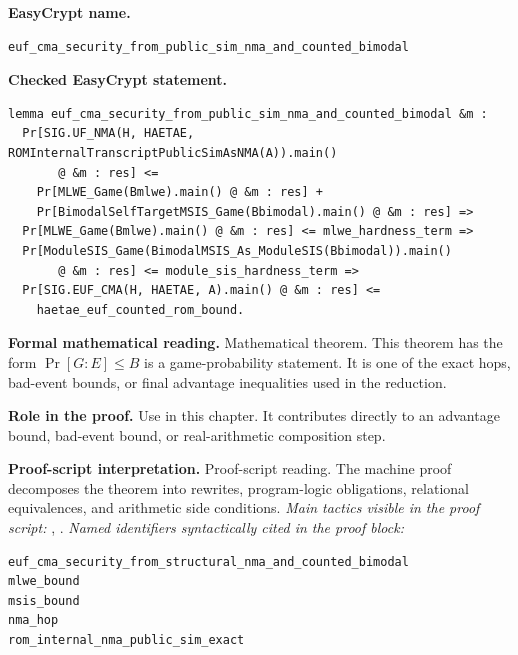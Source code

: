 \begin{formaltheorem}
\noindent\textbf{EasyCrypt name.}
\begin{lstlisting}[language=EasyCrypt,basicstyle=\ttfamily\scriptsize]
euf_cma_security_from_public_sim_nma_and_counted_bimodal
\end{lstlisting}
\noindent\textbf{Checked EasyCrypt statement.}
\begin{lstlisting}[language=EasyCrypt,basicstyle=\ttfamily\scriptsize]
lemma euf_cma_security_from_public_sim_nma_and_counted_bimodal &m :
  Pr[SIG.UF_NMA(H, HAETAE, ROMInternalTranscriptPublicSimAsNMA(A)).main()
       @ &m : res] <=
    Pr[MLWE_Game(Bmlwe).main() @ &m : res] +
    Pr[BimodalSelfTargetMSIS_Game(Bbimodal).main() @ &m : res] =>
  Pr[MLWE_Game(Bmlwe).main() @ &m : res] <= mlwe_hardness_term =>
  Pr[ModuleSIS_Game(BimodalMSIS_As_ModuleSIS(Bbimodal)).main()
       @ &m : res] <= module_sis_hardness_term =>
  Pr[SIG.EUF_CMA(H, HAETAE, A).main() @ &m : res] <=
    haetae_euf_counted_rom_bound.
\end{lstlisting}
\noindent\textbf{Formal mathematical reading.}
Mathematical theorem. This theorem has the form \(\Pr[G:E] \le B\) is a game-probability statement.  It is one of the exact hops, bad-event bounds, or final advantage inequalities used in the reduction.

\noindent\textbf{Role in the proof.}
Use in this chapter. It contributes directly to an advantage bound, bad-event bound, or real-arithmetic composition step.

\noindent\textbf{Proof-script interpretation.}
Proof-script reading. The machine proof decomposes the theorem into rewrites, program-logic obligations, relational equivalences, and arithmetic side conditions.
\emph{Main tactics visible in the proof script:} , .
\emph{Named identifiers syntactically cited in the proof block:}
\begin{lstlisting}[language=EasyCrypt,basicstyle=\ttfamily\scriptsize]
euf_cma_security_from_structural_nma_and_counted_bimodal
mlwe_bound
msis_bound
nma_hop
rom_internal_nma_public_sim_exact
\end{lstlisting}

\end{formaltheorem}

